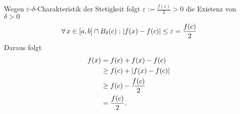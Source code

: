 \documentclass[../ana1.tex]{subfiles}
\begin{document}
\begin{bew}
    Wegen \( \varepsilon \)-\(\delta \)-Charakteristik der 
    Stetigkeit folgt \( \varepsilon := \frac{f(c)}{2} > 0 \) 
    die Existenz von \( \delta > 0 \)
    \[ \forall \, x\in [a,b] \cap B_\delta(c) : 
    \left|f(x) - f(c)\right| \leq \varepsilon = \frac{f(c)}{2} \]
    Daraus folgt
    \begin{align*}
        f(x) &= f(c) + f(x) - f(c) \\
        &\geq f(c) + \left|f(x) - f(c)\right| \\
        &\geq f(c) - \frac{f(c)}{2} \\
        &= \frac{f(c)}{2}.
    \end{align*}
\end{bew}
\end{document}
